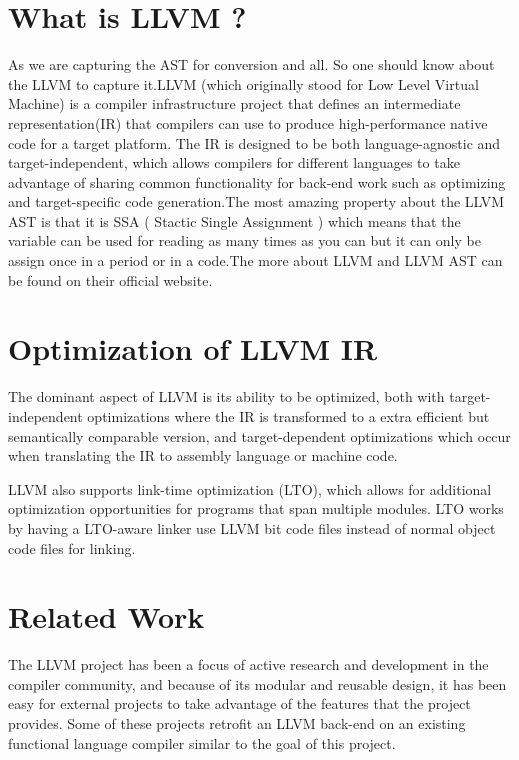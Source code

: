 \documentclass[openany]{book}
\begin{document}
	\section{What is LLVM ?}
	As we are capturing the AST for conversion and all. So one should know about the LLVM to capture it.LLVM (which originally stood for Low Level Virtual Machine) is a compiler infrastructure project that defines an intermediate representation(IR) that compilers can use to produce high-performance native code for a target platform. The IR is designed to be both language-agnostic and target-independent, which allows compilers for different languages to take advantage of sharing common functionality for back-end work such as optimizing and target-specific code generation.\newline \newline The most amazing property about the LLVM AST is that it is SSA ( Stactic Single Assignment ) which means that the variable can be used for reading as many times as you can but it can only be assign once in a period or in a code.\newline \newline The more about LLVM and LLVM AST can be found on their official website. \newpage
	

	\section{Optimization of LLVM IR}
	 The dominant aspect of LLVM is its ability to be optimized, both with target-independent optimizations  where  the  IR  is  transformed  to  a  extra  efficient  but  semantically  comparable version, and target-dependent optimizations which occur when translating the IR to assembly language or machine code.\newline
	 
	 LLVM also supports link-time optimization (LTO),  which allows for additional optimization opportunities for programs that span multiple modules. LTO works by having a LTO-aware linker use LLVM bit code files instead of normal object code files for linking.
	 
	\section{Related Work}
	The LLVM project has been a focus of active research and development in the compiler	community, and because of its modular and reusable design, it has been easy for external
	projects to take advantage of the features that the project provides. Some of these projects retrofit an LLVM back-end on an existing functional language compiler similar to the goal
	of this project.
	
\end{document}
